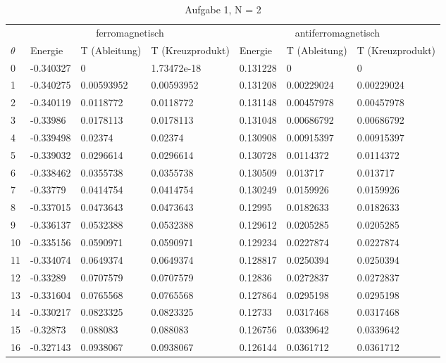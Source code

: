 \begin{longtable}{l|lll|lll}
\caption[]{Aufgabe 1, N = 2}\\
\hline\hline
& \multicolumn{3}{c}{ferromagnetisch} & \multicolumn{3}{c}{antiferromagnetisch} \\
$\theta$ & Energie & T (Ableitung) & T (Kreuzprodukt) & Energie & T (Ableitung) & T (Kreuzprodukt) \\
\hline
\endhead
\hline
   0 & -0.340327    & 0           & 1.73472e-18 &  0.131228    & 0           & 0           \\
   1 & -0.340275    & 0.00593952  & 0.00593952  &  0.131208    & 0.00229024  & 0.00229024  \\
   2 & -0.340119    & 0.0118772   & 0.0118772   &  0.131148    & 0.00457978  & 0.00457978  \\
   3 & -0.33986     & 0.0178113   & 0.0178113   &  0.131048    & 0.00686792  & 0.00686792  \\
   4 & -0.339498    & 0.02374     & 0.02374     &  0.130908    & 0.00915397  & 0.00915397  \\
   5 & -0.339032    & 0.0296614   & 0.0296614   &  0.130728    & 0.0114372   & 0.0114372   \\
   6 & -0.338462    & 0.0355738   & 0.0355738   &  0.130509    & 0.013717    & 0.013717    \\
   7 & -0.33779     & 0.0414754   & 0.0414754   &  0.130249    & 0.0159926   & 0.0159926   \\
   8 & -0.337015    & 0.0473643   & 0.0473643   &  0.12995     & 0.0182633   & 0.0182633   \\
   9 & -0.336137    & 0.0532388   & 0.0532388   &  0.129612    & 0.0205285   & 0.0205285   \\
  10 & -0.335156    & 0.0590971   & 0.0590971   &  0.129234    & 0.0227874   & 0.0227874   \\
  11 & -0.334074    & 0.0649374   & 0.0649374   &  0.128817    & 0.0250394   & 0.0250394   \\
  12 & -0.33289     & 0.0707579   & 0.0707579   &  0.12836     & 0.0272837   & 0.0272837   \\
  13 & -0.331604    & 0.0765568   & 0.0765568   &  0.127864    & 0.0295198   & 0.0295198   \\
  14 & -0.330217    & 0.0823325   & 0.0823325   &  0.12733     & 0.0317468   & 0.0317468   \\
  15 & -0.32873     & 0.088083    & 0.088083    &  0.126756    & 0.0339642   & 0.0339642   \\
  16 & -0.327143    & 0.0938067   & 0.0938067   &  0.126144    & 0.0361712   & 0.0361712   \\

\end{longtable}
